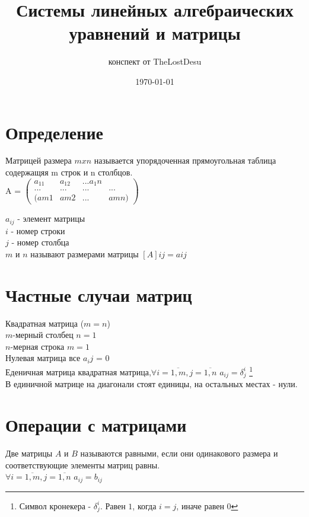 \documentclass[a4paper,12pt]{article}
\author{конспект от TheLostDesu}
\title{Системы линейных алгебраических уравнений и матрицы}
\date{\today}
\begin{document}
\maketitle
\section{Определение}
Матрицей размера $m x n$ называется упорядоченная прямоугольная таблица содержащяя m строк  и n столбцов.\\

A = $\begin{pmatrix}
	a_11 & a_12 & ... a_1n \\
	... & ... & ... & ...\\
	(am1 & am2 & ... & amn)
\end{pmatrix}$

$a_{ij}$ - элемент матрицы\\ 
$i$ - номер строки\\
$j$ - номер столбца\\
$m$ и $n$ называют размерами матрицы
$[A]ij = aij$\\

\section{Частные случаи матриц}
Квадратная матрица\hspace{20pt}  ($m = n$)\\
$m$-мерный столбец\hspace{20pt} $n = 1$\\
$n$-мерная строка\hspace{20pt} $m = 1$\\
Нулевая матрица\hspace{20pt} все $a_ij$ = 0\\
Еденичная матрица \hspace{19pt} квадратная матрица,$\forall i = \overline{1, m}, j = \overline{1, n}$ $a_{ij} = \delta^i_j$ \footnote{Символ кронекера - $\delta^i_j$. Равен $1$, когда $i = j$, иначе равен 0}\\
В единичной матрице на диагонали стоят единицы, на остальных местах - нули.

\section{Операции с матрицами}
Две матрицы $A$ и $B$ называются равными, если они одинакового размера и соответствующие элементы матриц равны.\\
$\forall i = \overline{1, m}, j = \overline{1, n}$ $a_{ij} = b_{ij}$
\end{document}
